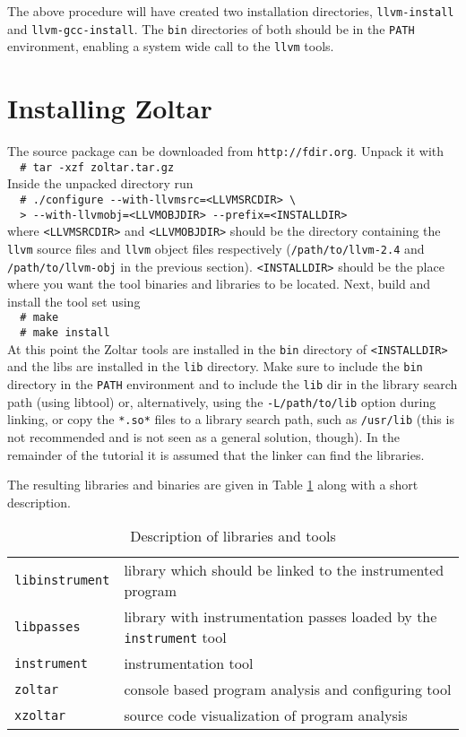 The above procedure will have created two installation directories,
\verb|llvm-install| and \verb|llvm-gcc-install|.
The \verb|bin| directories of both should be in the \verb|PATH| environment,
enabling a system wide call to the \verb|llvm| tools.


\section{Installing Zoltar}

The source package can be downloaded from \verb|http://fdir.org|.
Unpack it with \\
\verb|  # tar -xzf zoltar.tar.gz|\\
Inside the unpacked directory run \\
\verb|  # ./configure --with-llvmsrc=<LLVMSRCDIR> \|\\
\verb|  > --with-llvmobj=<LLVMOBJDIR> --prefix=<INSTALLDIR>|\\
where \verb|<LLVMSRCDIR>| and
\verb|<LLVMOBJDIR>| should be the directory containing the 
\verb|llvm| source files and \verb|llvm| object files respectively
(\verb|/path/to/llvm-2.4| and \verb|/path/to/llvm-obj| in the previous section).
\verb|<INSTALLDIR>| should be the place where you want the tool binaries and libraries to
be located.
Next, build and install the tool set using \\
\verb|  # make|\\
\verb|  # make install|\\
At this point the Zoltar tools are installed in the \verb|bin| directory of \verb|<INSTALLDIR>|
and the libs are installed in the \verb|lib| directory.
Make sure to include the \verb|bin| directory in the \verb|PATH| environment 
and to include the \verb|lib| dir in the library search path (using libtool) or, alternatively,
using the \verb|-L/path/to/lib| option during linking, or
copy the \verb|*.so*| files to a library search path, such as \verb|/usr/lib|
(this is not recommended and is not seen as a general solution, though).
In the remainder of the tutorial it is assumed that the linker can find the libraries.

The resulting libraries and binaries are given in Table \ref{t:LibsAndTools} 
along with a short description.

\begin{table}
  \begin{tabular}{l|l}
    \hline
	\verb|libinstrument| & library which should be linked to the instrumented program \\
	\verb|libpasses|     & library with instrumentation passes loaded by the \verb|instrument| tool \\
	\verb|instrument|    & instrumentation tool \\
	\verb|zoltar|       & console based program analysis and configuring tool \\
	\verb|xzoltar|      & source code visualization of program analysis \\
    \hline
  \end{tabular}
  \caption{Description of libraries and tools}
  \label{t:LibsAndTools}
\end{table}


